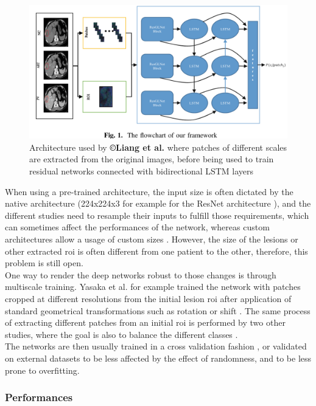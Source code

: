\begin{figure}[th!]
\centering
\includegraphics[width=0.7\linewidth]{images/image7}
\caption{Architecture used by \textbf{©Liang et al.} where patches of different scales are extracted from the original images, before being used to train residual networks connected with bidirectional LSTM layers \cite{Liang2018}}
\label{Liang2018_Fig1}
\end{figure}



When using a pre-trained architecture, the input size is often dictated
by the native architecture (224x224x3 for example for the ResNet
architecture \cite{Peng2020,WANG2019}), and
the different studies need to resample their inputs to fulfill those
requirements, which can sometimes affect the performances of the
network, whereas custom architectures allow a usage of custom sizes 
\cite{Liang2018,Yasaka2018,Yasaka2018a}. However, 
the size of the lesions or other extracted \ac{roi} is often different 
from one patient to the other, therefore, this problem is still open.\\
One way to render the deep networks robust to those changes is through
multiscale training. Yasaka et al. for example trained the network
with patches cropped at different resolutions from the initial lesion
\ac{roi} after application of standard geometrical transformations
such as rotation or shift \cite{Yasaka2018}. The same
process of extracting different patches from an initial \ac{roi} is performed
by two other studies, where the goal is also to balance the different
classes \cite{Yasaka2018a,Peng2020}.\\
The networks are then usually trained in a cross validation fashion \cite{Yamada2019,Yasaka2018,Yasaka2018a,WANG2019}, or validated on external datasets \cite{Peng2020} to be less affected by the effect of randomness, and to
be less prone to overfitting.

\subsubsection{Performances}\label{performances}

